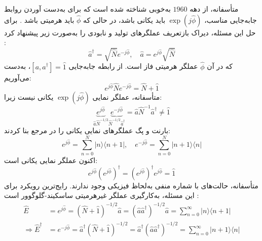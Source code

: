 متأسفانه، از دهه $1960$ به‌خوبی شناخته شده است که برای به‌دست آوردن روابط جابه‌جایی مناسب، $\exp(j\hat{\phi})$ باید یکانی باشد، در حالی که $\hat{\phi}$ باید هرمیتی باشد \cite{1,2,3,4,5}. برای حل این مسئله، دیراک بازتعریف عملگرهای تولید و نابودی را به‌صورت زیر پیشنهاد کرد \cite{1}:
\begin{equation}
	\hat{a}^\dagger = \sqrt{\hat{N}} e^{-j\hat{\phi}}, \quad \hat{a} = e^{j\hat{\phi}} \sqrt{\hat{N}}
	\label{eq:11-9}
\end{equation}
که در آن $\hat{\phi}$ عملگر هرمیتی فاز است. از رابطه جابه‌جایی $[a, a^\dagger] = \hat{1}$، به‌دست می‌آوریم:
\begin{equation}
	e^{j\hat{\phi}} \hat{N} e^{-j\hat{\phi}} = \hat{N} + \hat{1}
	\label{eq:11-10}
\end{equation}
متأسفانه، عملگر نمایی $\exp(j\hat{\phi})$ یکانی نیست زیرا:
\begin{equation}
	\underbrace{e^{j\hat{\phi}}}_{\hat{a}\hat{N}^{-1/2}} \underbrace{e^{-j\hat{\phi}}}_{\hat{N}^{-1/2}\hat{a}^\dagger} = \hat{a} \hat{N}^{-1} \hat{a}^\dagger \neq \hat{1}
	\label{eq:11-11}
\end{equation}
بارنت و پگ عملگرهای نمایی یکانی را در مرجع \cite{2} بنا کردند:
\begin{equation}
	e^{j\hat{\phi}} = \sum_{n=0}^{N} |n\rangle \langle n+1|, \quad e^{-j\hat{\phi}} = \sum_{n=0}^{N} |n+1\rangle \langle n|
	\label{eq:11-12}
\end{equation}
اکنون عملگر نمایی یکانی است:
\begin{equation}
	e^{j\hat{\phi}} (e^{j\hat{\phi}})^\dagger = (e^{j\hat{\phi}})^\dagger e^{j\hat{\phi}} = \hat{1}
	\label{eq:11-13}
\end{equation}
متأسفانه، حالت‌های با شماره منفی به‌لحاظ فیزیکی وجود ندارند. رایج‌ترین رویکرد برای این مسئله، به‌کارگیری عملگر غیرهرمیتی ساسکیند-گلوگوور است \cite{3,4,5}:
\begin{equation}
	\begin{aligned}
		\hat{E} &= e^{j\hat{\phi}} = (\hat{N} + \hat{1})^{-1/2} \hat{a} = (\hat{a}\hat{a}^\dagger)^{-1/2} \hat{a} = \sum_{n=0}^{\infty} |n\rangle \langle n+1| \\
		\Rightarrow \hat{E}^\dagger &= e^{-j\hat{\phi}} = \hat{a}^\dagger (\hat{N} + \hat{1})^{-1/2} = \hat{a}^\dagger (\hat{a}\hat{a}^\dagger)^{-1/2} = \sum_{n=0}^{\infty} | n+1 \rangle \langle n|
		\label{eq:11-14}
	\end{aligned}
\end{equation}
